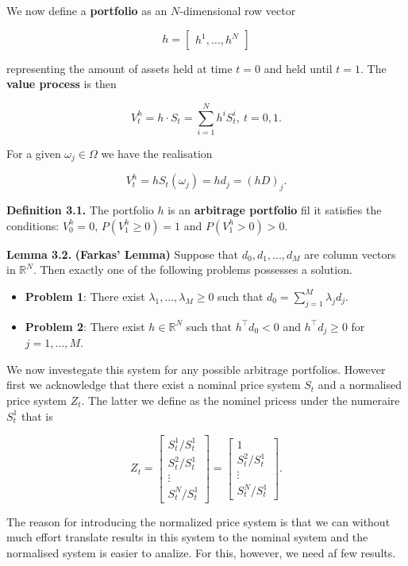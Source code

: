 \documentclass[
]{article}
\providecommand{\tightlist}{%
  \setlength{\itemsep}{0pt}\setlength{\parskip}{0pt}}
\begin{document}
We now define a \textbf{portfolio} as an \(N\)-dimensional row vector

\[
h=\begin{bmatrix} h^1, \dots,h^N\end{bmatrix}
\]

representing the amount of assets held at time \(t=0\) and held until
\(t=1\). The \textbf{value process} is then

\[
V^h_t=h\cdot S_t=\sum_{i=1}^N h^iS_t^i,\ t=0,1.
\]

For a given \(\omega_j\in\Omega\) we have the realisation

\[
V_t^h=hS_t(\omega_j)=hd_j=(hD)_j.
\]

\textbf{Definition 3.1.} The portfolio \(h\) is an \textbf{arbitrage
portfolio} fil it satisfies the conditions: \(V_0^h=0\),
\(P(V_1^h\ge 0)=1\) and \(P(V_1^h>0)>0\).

\textbf{Lemma 3.2.} \textbf{(Farkas' Lemma)} Suppose that
\(d_0,d_1,...,d_M\) are column vectors in \(\mathbb{R}^N\). Then exactly
one of the following problems possesses a solution.

\begin{itemize}
\tightlist
\item
  \textbf{Problem 1}: There exist \(\lambda_1,...,\lambda_M\ge0\) such
  that \(d_0=\sum_{j=1}^M\lambda_jd_j\).
\item
  \textbf{Problem 2}: There exist \(h\in\mathbb{R}^N\) such that
  \(h^\top d_0<0\) and \(h^\top d_j\ge 0\) for \(j=1,...,M\).
\end{itemize}

We now investegate this system for any possible arbitrage portfolios.
However first we acknowledge that there exist a nominal price system
\(S_t\) and a normalised price system \(Z_t\). The latter we define as
the nominel pricess under the numeraire \(S_t^1\) that is

\[
Z_t=\begin{bmatrix} S_t^1/S_t^1\\
S_t^2/S_t^1\\
\vdots\\
S_t^N/S_t^1\end{bmatrix}=\begin{bmatrix} 1\\
S_t^2/S_t^1\\
\vdots\\
S_t^N/S_t^1\end{bmatrix}.
\]

The reason for introducing the normalized price system is that we can
without much effort translate results in this system to the nominal
system and the normalised system is easier to analize. For this,
however, we need af few results.
\end{document}
